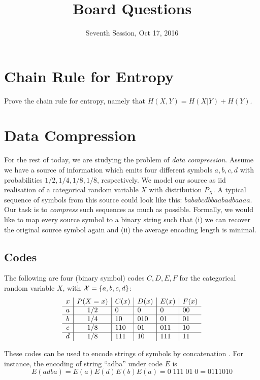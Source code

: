 \documentclass[11p,a4paper]{article}
\title{Board Questions}
\date{Seventh Session, Oct 17, 2016}
\begin{document}
\maketitle

\section{Chain Rule for Entropy}
Prove the chain rule for entropy, namely that $H(X,Y)=H(X|Y)+H(Y)$.

\section{Data Compression}
For the rest of today, we are studying the problem of \emph{data
  compression}. Assume we have a source of information which emits
four different symbols $a,b,c,d$ with probabilities $1/2,1/4,1/8,1/8$,
respectively. We model our source as iid realisation of a
categorical random variable $X$ with distribution $P_X$. A typical
sequence of symbols from this source could look like this: $bababcdbbaabadbaaaa$.
Our task is to \emph{compress} such sequences as much as
possible. Formally, we would like to map every source symbol to a
binary string such that (i) we can recover the original source symbol
again and (ii) the average encoding length is minimal.


\subsection{Codes} \label{sec:codes}
The following are four (binary symbol) codes $C,D,E, F$ for the
categorical random variable $X$, with ${\cal X} = \{a,b,c,d\}$:
\[
\begin{array}{c | c | l | l | l | l}
x & P(X=x) & C(x) & D(x) & E(x) & F(x)\\
\hline
a & 1/2 & 0   & 0   & 0   & 00 \\
\hline
b & 1/4 & 10  & 010 & 01  & 01\\
\hline
c & 1/8 & 110 & 01  & 011 & 10 \\
\hline
d & 1/8 & 111 & 10  & 111 & 11 \\
\end{array}
\]

These codes can be used to encode strings of symbols by concatenation . For instance,
the encoding of string ``adba'' under code $E$ is
\[
E(adba) = E(a) E(d) E(b) E(a) = 0 \; 111 \; 01 \; 0 = 0111010
\]
\end{document}
